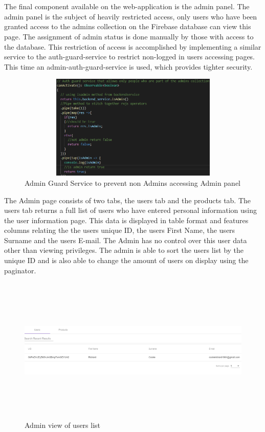 \\ \\
The final component available on the web-application is the admin panel. The admin panel is the subject of heavily restricted access, only users who have been granted access to the admins collection on the Firebase database can view this page. The assignment of admin status is done manually by those with access to the database. This restriction of access is accomplished by implementing a similar service to the auth-guard-service to restrict non-logged in users accessing pages. This time an admin-auth-guard-service is used, which provides tighter security. 
\begin{figure}[h!]
    	\caption{Admin Guard Service to prevent non Admins accessing Admin panel}
	\centering
	\includegraphics[width=12cm, height=5cm]{images/adminguard.png}
\end{figure}
\newpage
The Admin page consists of two tabs, the users tab and the products tab. The users tab returns a full list of users who have entered personal information using the user information page. This data is displayed in table format and features columns relating the the users unique ID, the users First Name, the users Surname and the users E-mail. The Admin has no control over this user data other than viewing privileges. The admin is able to sort the users list by the unique ID and is also able to change the amount of users on display using the paginator.


\begin{figure}[h!]
    	\caption{Admin view of users list}
	\centering
	\includegraphics[width=15cm, height=7cm]{images/adminusers.png}
\end{figure}

